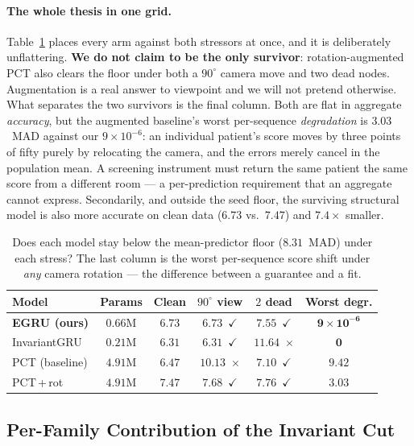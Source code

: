 \paragraph{The whole thesis in one grid.} Table~\ref{tab:pareto} places every arm against both
stressors at once, and it is deliberately unflattering. \textbf{We do not claim to be the only
survivor}: rotation-augmented PCT also clears the floor under both a $90^\circ$ camera move and two
dead nodes. Augmentation is a real answer to viewpoint and we will not pretend otherwise. What
separates the two survivors is the final column. Both are flat in aggregate \emph{accuracy}, but the
augmented baseline's worst per-sequence \emph{degradation} is $3.03$~MAD against our
$9\times10^{-6}$: an individual patient's score moves by three points of fifty purely by relocating
the camera, and the errors merely cancel in the population mean. A screening instrument must return
the same patient the same score from a different room --- a per-prediction requirement that an
aggregate cannot express. Secondarily, and outside the seed floor, the surviving structural model is
also more accurate on clean data ($6.73$ vs.\ $7.47$) and $7.4\times$ smaller.

\begin{table}[!t]
\centering
\caption{Does each model stay below the mean-predictor floor ($8.31$~MAD) under each stress? The last
column is the worst per-sequence score shift under \emph{any} camera rotation --- the difference
between a guarantee and a fit.}
\label{tab:pareto}
\scriptsize
\setlength{\tabcolsep}{4pt}
\begin{tabular}{lccccc}
\toprule
Model & Params & Clean & $90^\circ$ view & $2$ dead & Worst degr. \\
\midrule
\textbf{EGRU (ours)} & $0.66$M & $6.73$ & $6.73$~$\checkmark$ & $7.55$~$\checkmark$ & $\mathbf{9\!\times\!10^{-6}}$ \\
InvariantGRU   & $0.21$M & $6.31$ & $6.31$~$\checkmark$ & $11.64$~$\times$ & $\mathbf{0}$ \\
PCT (baseline) & $4.91$M & $6.47$ & $10.13$~$\times$ & $7.10$~$\checkmark$ & $9.42$ \\
PCT\,+\,rot    & $4.91$M & $7.47$ & $7.68$~$\checkmark$ & $7.76$~$\checkmark$ & $3.03$ \\
\bottomrule
\end{tabular}
\end{table}

\subsection{Per-Family Contribution of the Invariant Cut}
\label{sec:results:ablation}

